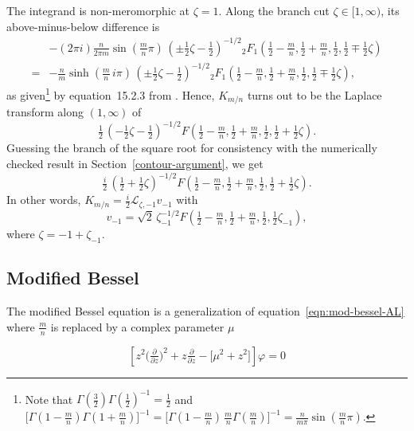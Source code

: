 \documentclass{article}
\theoremstyle{definition}
\newcommand{\laplace}{\mathcal{L}}
\begin{document}
The integrand is non-meromorphic at $\zeta = 1$. Along the branch cut $\zeta \in [1, \infty)$, its above-minus-below difference is
\begin{align*}
& -(2\pi i)\tfrac{n}{2\pi m} \sin(\tfrac{m}{n} \pi)\,(\pm\tfrac{1}{2}\zeta - \tfrac{1}{2})^{-1/2} {}_2F_1(\tfrac{1}{2} - \tfrac{m}{n}, \tfrac{1}{2} + \tfrac{m}{n}, \tfrac{1}{2}, \tfrac{1}{2} \mp \tfrac{1}{2}\zeta) \\
= & -\tfrac{n}{m} \sinh(\tfrac{m}{n}\,i\pi)\,(\pm\tfrac{1}{2}\zeta - \tfrac{1}{2})^{-1/2} {}_2F_1(\tfrac{1}{2} - \tfrac{m}{n}, \tfrac{1}{2} + \tfrac{m}{n}, \tfrac{1}{2}, \tfrac{1}{2} \mp \tfrac{1}{2}\zeta),
\end{align*}
as given\footnote{Note that $\Gamma(\tfrac{3}{2}) \Gamma(\tfrac{1}{2})^{-1} = \tfrac{1}{2}$ and $\big[\Gamma(1 - \tfrac{m}{n})\Gamma(1 + \tfrac{m}{n})\big]^{-1} = \big[\Gamma(1 - \tfrac{m}{n})\,\tfrac{m}{n}\Gamma(\tfrac{m}{n})\big]^{-1} = \tfrac{n}{m\pi} \sin(\tfrac{m}{n} \pi)$.} by equation~15.2.3 from \cite{dlmf}. Hence, $K_{m/n}$ turns out to be the Laplace transform along $(1, \infty)$ of
\[ \tfrac{1}{2}\,(-\tfrac{1}{2}\zeta - \tfrac{1}{2})^{-1/2} F(\tfrac{1}{2} - \tfrac{m}{n}, \tfrac{1}{2} + \tfrac{m}{n}, \tfrac{1}{2}, \tfrac{1}{2} + \tfrac{1}{2}\zeta). \]
\color{DarkCyan}
Guessing the branch of the square root for consistency with the numerically checked result in Section~\ref{contour-argument}, we get
\[ \tfrac{i}{2}\,(\tfrac{1}{2} + \tfrac{1}{2}\zeta)^{-1/2} F(\tfrac{1}{2} - \tfrac{m}{n}, \tfrac{1}{2} + \tfrac{m}{n}, \tfrac{1}{2}, \tfrac{1}{2} + \tfrac{1}{2}\zeta). \]
In other words, $K_{m/n} = \tfrac{i}{2} \laplace_{\zeta, -1} v_{-1}$ with
\[ v_{-1} = \sqrt{2}\,\zeta_{-1}^{-1/2} F(\tfrac{1}{2} - \tfrac{m}{n}, \tfrac{1}{2} + \tfrac{m}{n}, \tfrac{1}{2}, \tfrac{1}{2}\zeta_{-1}), \]
where $\zeta = -1 + \zeta_{-1}$.
\color{black}


\subsection{Modified Bessel}

The modified Bessel equation is a generalization of equation~\eqref{eqn:mod-bessel-AL} where $\frac{m}{n}$ is replaced by a complex parameter $\mu$

\begin{equation}\label{eqn:mod-bessel}
\left[z^2 \big(\tfrac{\partial}{\partial z}\big)^2 + z \tfrac{\partial}{\partial z} - \big[\mu^2 + z^2\big]\right] \varphi = 0
\end{equation}
\end{document}
